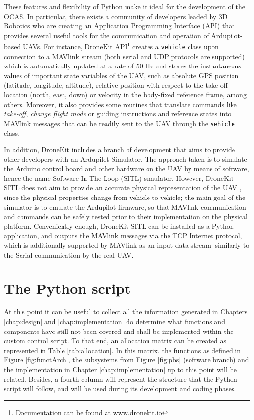 These features and flexibility of Python make it ideal for the development of the OCAS.
In particular, there exists a community of developers leaded by 3D Robotics who are creating an Application Programming Interface (API) that provides several useful tools for the communication and operation of Ardupilot-based UAVs.
For instance, DroneKit API\footnote{Documentation can be found at \url{www.dronekit.io}} creates a \texttt{vehicle} class upon connection to a MAVlink stream (both serial and UDP protocols are supported) which is automatically updated at a rate of 50 Hz and stores the instantaneous values of important state variables of the UAV, such as absolute GPS position (latitude, longitude, altitude), relative position with respect to the take-off location (north, east, down) or velocity in the body-fixed reference frame, among others.
Moreover, it also provides some routines that translate commands like \emph{take-off}, \emph{change flight mode} or guiding instructions and reference states into MAVlink messages that can be readily sent to the UAV through the \texttt{vehicle} class.

In addition, DroneKit includes a branch of development that aims to provide other developers with an Ardupilot Simulator.
The approach taken is to simulate the Arduino control board and other hardware on the UAV by means of software, hence the name Software-In-The-Loop (SITL) simulator.
However, DroneKit-SITL does not aim to provide an accurate physical representation of the UAV \cite{vegaastorga2016}, since the physical properties change from vehicle to vehicle; the main goal of the simulator is to emulate the Ardupilot firmware, so that MAVlink communication and commands can be safely tested prior to their implementation on the physical platform.
Conveniently enough, DroneKit-SITL can be installed as a Python application, and outputs the MAVlink messages via the TCP Internet protocol, which is additionally supported by MAVlink as an input data stream, similarly to the Serial communication by the real UAV.


\section{The Python script}	\label{sec:script}

At this point it can be useful to collect all the information generated in Chapters \ref{chap:design} and \ref{chap:implementation} do determine what functions and components have still not been covered and shall be implemented within the custom control script.
To that end, an allocation matrix can be created as represented in Table \ref{tab:allocation}.
In this matrix, the functions as defined in Figure \ref{fig:functArch}, the subsystems from Figure \ref{fig:pbs} (software branch) and the implementation in Chapter \ref{chap:implementation} up to this point will be related.
Besides, a fourth column will represent the structure that the Python script will follow, and will be used during its development and coding phases.

